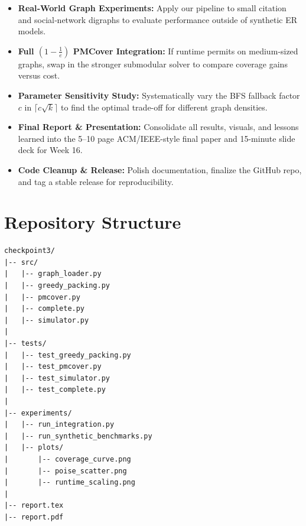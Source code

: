 \documentclass[11pt]{article}
\begin{document}
\begin{itemize}
  \item \textbf{Real‐World Graph Experiments:}  
    Apply our pipeline to small citation and social‐network digraphs to evaluate performance
    outside of synthetic ER models.
  \item \textbf{Full \((1-\tfrac{1}{e})\) PMCover Integration:}  
    If runtime permits on medium‐sized graphs, swap in the stronger submodular solver to
    compare coverage gains versus cost.
  \item \textbf{Parameter Sensitivity Study:}  
    Systematically vary the BFS fallback factor \(c\) in \(\lceil c\sqrt{k}\rceil\) to find the
    optimal trade-off for different graph densities.
  \item \textbf{Final Report \& Presentation:}  
    Consolidate all results, visuals, and lessons learned into the 5–10 page ACM/IEEE-style
    final paper and 15-minute slide deck for Week 16.
  \item \textbf{Code Cleanup \& Release:}  
    Polish documentation, finalize the GitHub repo, and tag a stable release for reproducibility.
\end{itemize}
\section{Repository Structure}
\begin{lstlisting}[basicstyle=\ttfamily,columns=fullflexible]
checkpoint3/
|-- src/
|   |-- graph_loader.py
|   |-- greedy_packing.py
|   |-- pmcover.py
|   |-- complete.py
|   |-- simulator.py
|
|-- tests/
|   |-- test_greedy_packing.py
|   |-- test_pmcover.py
|   |-- test_simulator.py
|   |-- test_complete.py
|
|-- experiments/
|   |-- run_integration.py
|   |-- run_synthetic_benchmarks.py
|   |-- plots/
|       |-- coverage_curve.png
|       |-- poise_scatter.png
|       |-- runtime_scaling.png
|
|-- report.tex
|-- report.pdf
\end{lstlisting}
\end{document}
